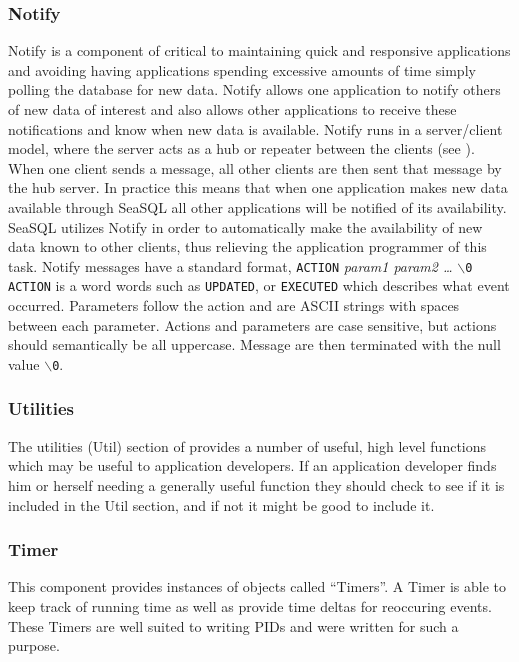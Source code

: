 \subsubsection{Notify} \label{overviewnotify}
Notify is a component of \libseawolf{} critical to maintaining quick and
responsive applications and avoiding having applications spending excessive
amounts of time simply polling the database for new data. Notify allows one
application to notify others of new data of interest and also allows other
applications to receive these notifications and know when new data is
available. Notify runs in a server/client model, where the server acts as a hub
or repeater between the clients (see ). When one client sends a message, all other clients are then sent
that message by the hub server. In practice this means that when one application
makes new data available through SeaSQL all other applications will be notified
of its availability. SeaSQL utilizes Notify in order to automatically make the
availability of new data known to other clients, thus relieving the application
programmer of this task. Notify messages have a standard format,
\vspace{10pt}\hfill\newline
\indent\texttt{ACTION} \textit{param1 param2 \ldots{}} \texttt{$\backslash$0}
\vspace{10pt}\hfill\newline \texttt{ACTION} is a word words such as
\texttt{UPDATED}, or \texttt{EXECUTED} which describes what event
occurred. Parameters follow the action and are ASCII strings with spaces between
each parameter. Actions and parameters are case sensitive, but actions should
semantically be all uppercase. Message are then terminated with the null value
\texttt{$\backslash$0}.

\subsubsection{Utilities} \label{overviewutil}
The utilities (Util) section of \libseawolf{} provides a number of useful, high
level functions which may be useful to application developers. If an application
developer finds him or herself needing a generally useful function they should
check to see if it is included in the Util section, and if not it might be good
to include it.

\subsubsection{Timer} \label{overviewtimer}
This component provides instances of objects called ``Timers''. A Timer is able
to keep track of running time as well as provide time deltas for reoccuring
events. These Timers are well suited to writing PIDs and were written for such a
purpose.

